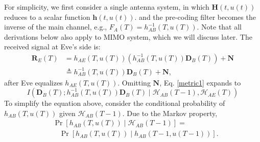 For simplicity, we first consider a single antenna system, in which $\mathbf{H}\left(t,u(t)\right)$ reduces to a scalar function $\mathbf{h}\left(t,u(t)\right)$. and the pre-coding filter becomes the inverse of the main channel, e.g., $F_A(T) = h_{AB}^{-1}\left(T,u(T)\right)$. Note that all derivations below also apply to MIMO system, which we will discuss later. The received signal at Eve's side is:
\begin{equation*}
\begin{split}
    \mathbf{R}_E(T) & = h_{AE}\left(T,u(T)\right) \left(h_{AB}^{-1}\left(T,u(T)\right) \mathbf{D}_B(T)\right) + \mathbf{N} \\
    & \triangleq h_{AB}^{-1}\left(T,u(T)\right)  \mathbf{D}_B(T) + \mathbf{N},
    \label{eq:yt}
\end{split}
\end{equation*}
after Eve equalizes $h_{AE}\left(T,u(T)\right)$. Omitting  $\mathbf{N}$, Eq. \eqref{metric1} expands to 
\begin{equation*}
    I\left(\mathbf{D}_B(T);h_{AB}^{-1}\left(T,u(T)\right)  \mathbf{D}_B(T) \mid \mathcal{H}_{AB}(T-1),\mathcal{H}_{AE}(T)\right)
    \label{metric2}
\end{equation*}
To simplify the equation above, consider the conditional probability of $h_{AB}\left(T, u(T)\right)$ given  $\mathcal{H}_{AB}(T-1)$. Due to the Markov property,  
\begin{equation*}
\begin{split}
& \Pr\left[h_{AB}\left(T, u(T)\right)\mid \mathcal{H}_{AB}(T-1)\right] = \\
& \ \ \ \ \Pr\left[h_{AB}\left(T, u(T) \right) \mid h_{AB}\left(T-1, u(T-1)\right)\right].
\end{split}
\end{equation*}

